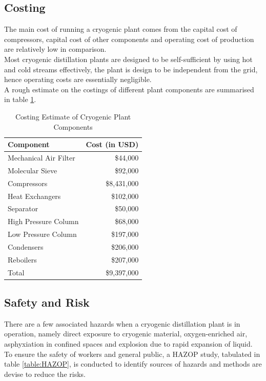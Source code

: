 \documentclass[11pt,oneside]{article}
\begin{document}
\subsection{Costing} \noindent
The main cost of running a cryogenic plant comes from the capital cost of compressors, capital cost of other components and operating cost of production are relatively low in comparison. \\
Most cryogenic distillation plants are designed to be self-sufficient by using hot and cold streams effectively, the plant is design to be independent from the grid, hence operating costs are essentially negligible.\\
A rough estimate on the costings of different plant components are summarised in table \ref{table:cost}.
\begin{table}[H]
    \singlespacing
    \centering
    \caption{Costing Estimate of Cryogenic Plant Components}
    \label{table:cost}
    \begin{tabular}{|l|r|}
        \hline
        Component                               & Cost (in USD)    \\     \hline
        Mechanical Air Filter \citep{matches}   & \$44,000         \\
        Molecular Sieve \citep{couper2012}      & \$92,000         \\
        Compressors \citep{matches}             & \$8,431,000      \\
        Heat Exchangers \citep{douglas1988}     & \$102,000        \\
        Separator \citep{matches}               & \$50,000         \\
        High Pressure Column \citep{douglas1988} & \$68,000         \\
        Low Pressure Column \citep{douglas1988}  & \$197,000        \\
        Condensers \citep{douglas1988}           & \$206,000        \\
        Reboilers \citep{douglas1988}            & \$207,000        \\     \hline
        Total                 & \$9,397,000     \\     \hline
    \end{tabular}
\end{table}

\subsection{Safety and Risk} \noindent
There are a few associated hazards when a cryogenic distillation plant is in operation, namely direct exposure to cryogenic material, oxygen-enriched air, asphyxiation in confined spaces and explosion due to rapid expansion of liquid. \\
To ensure the safety of workers and general public, a HAZOP study, tabulated in table \ref{table:HAZOP}, is conducted to identify sources of hazards and methods are devise to reduce the risks.
\end{document}
